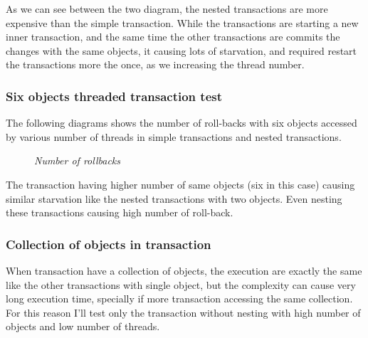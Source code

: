 \documentclass[12pt]{article}
\begin{document}
As we can see between the two diagram, the nested transactions are more expensive than the simple transaction. While the transactions are starting a new inner transaction, and the same time the other transactions are commits the changes with the same objects, it causing lots of starvation, and required restart the transactions more the once, as we increasing the thread number. 
  

\newpage
\subsubsection{Six objects threaded transaction test}
The following diagrams shows the number of roll-backs with six objects accessed by various number of threads in simple transactions and nested transactions.

\begin{figure}[h!]%
    \centering
    \qquad
    \caption*{\textit{\color{gray}Number of rollbacks}}%
    \label{fig:example}%
\end{figure}
The transaction having higher number of same objects (six in this case) causing similar starvation like the nested transactions with two objects. Even nesting these transactions causing high number of roll-back. 


\subsubsection{Collection of objects in transaction}
When transaction have a collection of objects, the execution are exactly the same like the other transactions with single object, but the complexity can cause very long execution time, specially if more transaction accessing the same collection. For this reason I'll test only the transaction without nesting with high number of objects and low number of threads.
\end{document}
